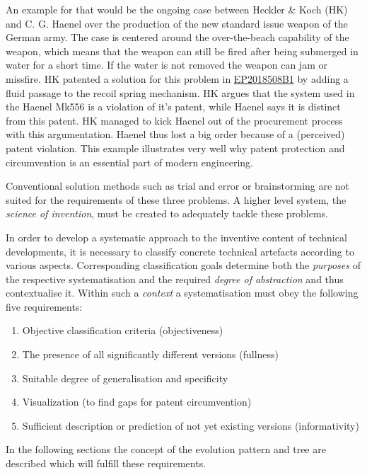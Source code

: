 \documentclass[11pt,a4paper]{article}
\begin{document}
An example for that would be the ongoing case between Heckler \& Koch (HK) and
C. G. Haenel over the production of the new standard issue weapon of the
German army. The case is centered around the over-the-beach capability of the
weapon, which means that the weapon can still be fired after being submerged
in water for a short time. If the water is not removed the weapon can jam or
missfire. HK patented a solution for this problem in
\href{https://patents.google.com/patent/EP2018508B1/en}{EP2018508B1} by adding
a fluid passage to the recoil spring mechanism. HK argues that the system used
in the Haenel Mk556 is a violation of it's patent, while Haenel says it is
distinct from this patent. HK managed to kick Haenel out of the procurement
process with this argumentation. Haenel thus lost a big order because of a
(perceived) patent violation. This example illustrates very well why patent
protection and circumvention is an essential part of modern engineering.

Conventional solution methods such as trial and error or brainstorming are not
suited for the requirements of these three problems. A higher level system,
the \textit{science of invention}, must be created to adequately tackle these
problems.

In order to develop a systematic approach to the inventive content of
technical developments, it is necessary to classify concrete technical
artefacts according to various aspects. Corresponding classification goals
determine both the \emph{purposes} of the respective systematisation and the
required \emph{degree of abstraction} and thus contextualise it.  Within such
a \emph{context} a systematisation must obey the following five requirements:
\begin{enumerate}[noitemsep]
\item Objective classification criteria (objectiveness)
\item The presence of all significantly different versions (fullness)
\item Suitable degree of generalisation and specificity
\item Visualization (to find gaps for patent circumvention)
\item Sufficient description or prediction of not yet existing versions
  (informativity)
\end{enumerate}

In the following sections the concept of the evolution pattern and tree are
described which will fulfill these requirements.
\end{document}
